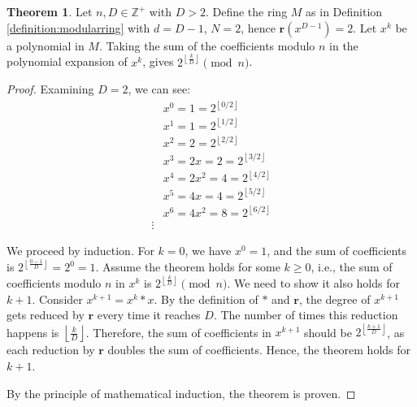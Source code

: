 \documentclass{article}
\theoremstyle{plain}
\theoremstyle{definition}
\newtheorem{theorem}{Theorem}
\newcommand{\floor}[1]{\left\lfloor #1 \right\rfloor}
\newcommand{\redu}{\textbf{r}}
\newcommand{\Z}{\mathbb{Z}}
\begin{document}
\begin{theorem} \label{theorem:polyflooredpowersoftwo}
Let $n, D \in \Z^+$ with $D>2$. Define the ring $M$ as in Definition \ref{definition:modularring} with $d=D-1$, $N=2$, hence $\redu(x^{D-1}) = 2$. Let $x^k$ be a polynomial in $M$. Taking the sum of the coefficients modulo $n$ in the polynomial expansion of \( x^k \), gives $2^{\floor{\frac{k}{D}}} \pmod{n}$.
\end{theorem}
\begin{proof}
Examining $D = 2$, we can see:
\begin{align*}
& x^0 = 1 = 2^{\floor{0/2}} \\
& x^1 = 1 = 2^{\floor{1/2}} \\
& x^2 = 2 = 2^{\floor{2/2}}\\
& x^3 = 2x = 2 = 2^{\floor{3/2}}\\
& x^4 = 2x^2 = 4 = 2^{\floor{4/2}}\\
& x^5 = 4x = 4 = 2^{\floor{5/2}}\\
& x^6 = 4x^2 = 8 = 2^{\floor{6/2}}\\
\vdots
\end{align*}

We proceed by induction. For \( k = 0 \), we have \( x^0 = 1 \), and the sum of coefficients is \( 2^{\floor{\frac{0-1}{D}}} = 2^{0} = 1 \). Assume the theorem holds for some \( k \geq 0 \), i.e., the sum of coefficients modulo \( n \) in \( x^k \) is \( 2^{\floor{\frac{k}{D}}} \pmod{n} \). We need to show it also holds for \( k+1 \). Consider \( x^{k+1} = x^k \ast x \). By the definition of \( \ast \) and \( \redu \), the degree of \( x^{k+1} \) gets reduced by \( \redu \) every time it reaches \( D \). The number of times this reduction happens is \( \floor{\frac{k}{D}} \). Therefore, the sum of coefficients in \( x^{k+1} \) should be \( 2^{\left\lfloor \frac{k+1}{D} \right\rfloor} \), as each reduction by \( \redu \) doubles the sum of coefficients. Hence, the theorem holds for \( k+1 \).

By the principle of mathematical induction, the theorem is proven.
\end{proof}
\end{document}

